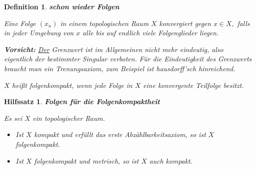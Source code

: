 \documentclass[12pt]{scrbook}   %
\newtheorem{hilfsX}[alles]{Hilfssatz}
\newenvironment{hilfs}[1]{\begin{hilfsX}{\bf #1}\par}{\end{hilfsX}}
\newtheorem{definiX}[alles]{Definition}
\newenvironment{defini}[1]{\begin{definiX}{\bf #1}\par\rm}{\end{definiX}}
\begin{document}
\begin{defini} {schon wieder Folgen}
Eine Folge $(x_n)$ in einem topologischen Raum $X$ {\it konvergiert gegen}
$x\in X,$ falls in jeder Umgebung von $x$ alle bis auf endlich viele 
Folgenglieder liegen.

{\bf Vorsicht:} \underline{Der} Grenzwert ist im Allgemeinen nicht mehr 
eindeutig, also eigentlich der bestimmter Singular verboten. Für die
Eindeutigkeit des Grenzwerts braucht man ein Trenungsaxiom, zum Beispiel ist 
hausdorff'sch hinreichend.

$X$ heißt {\it folgenkompakt}, wenn
jede Folge in $X$ eine konvergente Teilfolge besitzt.

\end{defini}

\begin{hilfs} {Folgen für die Folgenkompaktheit}
Es sei $X$ ein topologischer Raum.
\begin{itemize}
\item[a)] Ist $X$ kompakt und erfüllt das erste Abzählbarkeitsaxiom, so
ist $X$ folgenkompakt.
\item[b)] Ist $X$ folgenkompakt und metrisch, so ist $X$ auch kompakt.
\end{itemize}
\end{hilfs}
\end{document}
